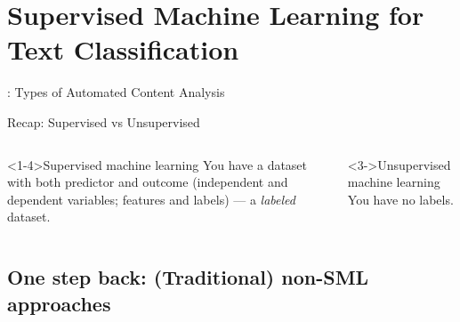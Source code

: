 \section{Supervised Machine Learning for Text Classification}

\begin{frame}{\cite{Boumans2016}: Types of Automated Content Analysis}
\end{frame}


\begin{frame}{Recap: Supervised vs Unsupervised}
\begin{columns}[t]

\begin{block}<1-4>{Supervised machine learning}
  You have a dataset with both predictor and outcome (independent and dependent variables; features and labels) --- a \emph{labeled} dataset.
\end{block}


\begin{block}<3->{Unsupervised machine learning}
  You have no labels. \\
\end{block}

\end{columns}

\end{frame}






\subsection{One step back: (Traditional) non-SML approaches}

